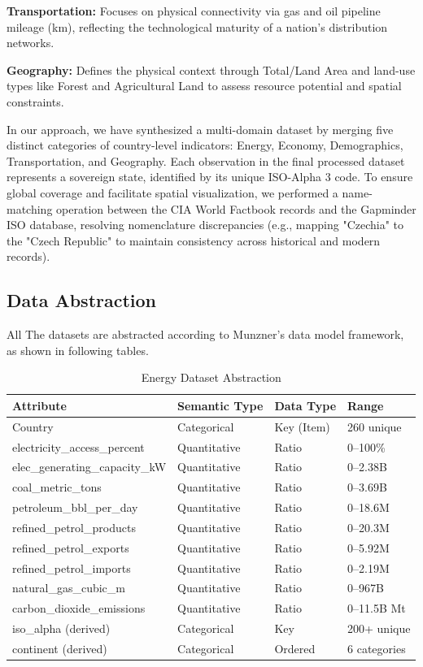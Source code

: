 \documentclass[conference]{IEEEtran}
\begin{document}
\textbf{Transportation:} Focuses on physical connectivity via gas and oil pipeline mileage (km), reflecting the technological maturity of a nation’s distribution networks.


\textbf{Geography:} Defines the physical context through Total/Land Area and land-use types like Forest and Agricultural Land to assess resource potential and spatial constraints.

In our approach, we have synthesized a multi-domain dataset by merging five distinct categories of country-level indicators: Energy, Economy, Demographics, Transportation, and Geography. Each observation in the final processed dataset represents a sovereign state, identified by its unique ISO-Alpha 3 code. To ensure global coverage and facilitate spatial visualization, we performed a name-matching operation between the CIA World Factbook records and the Gapminder ISO database, resolving nomenclature discrepancies (e.g., mapping "Czechia" to the "Czech Republic" to maintain consistency across historical and modern records).

\subsection{Data Abstraction}
All The datasets are abstracted according to Munzner's data model framework, as shown in following tables.

\begin{table}[h]
\centering
\caption{Energy Dataset Abstraction}
\label{tab:data_abstraction}
\small
\begin{tabular}{|p{3.7cm}|p{1.5cm}|p{0.9cm}|p{1.4cm}|}
\hline
\textbf{Attribute} & \textbf{Semantic Type} & \textbf{Data Type} & \textbf{Range} \\
\hline
Country & Categorical & Key (Item) & 260 unique \\
electricity\_access\_percent & Quantitative & Ratio & 0--100\% \\
elec\_generating\_capacity\_kW & Quantitative & Ratio & 0--2.38B \\
coal\_metric\_tons & Quantitative & Ratio & 0--3.69B \\
petroleum\_bbl\_per\_day & Quantitative & Ratio & 0--18.6M \\
refined\_petrol\_products & Quantitative & Ratio & 0--20.3M \\
refined\_petrol\_exports & Quantitative & Ratio & 0--5.92M \\
refined\_petrol\_imports & Quantitative & Ratio & 0--2.19M \\
natural\_gas\_cubic\_m & Quantitative & Ratio & 0--967B \\
carbon\_dioxide\_emissions & Quantitative & Ratio & 0--11.5B Mt \\
iso\_alpha (derived) & Categorical & Key & 200+ unique \\
continent (derived) & Categorical & Ordered & 6 categories \\
\hline
\end{tabular}
\end{table}
\end{document}
